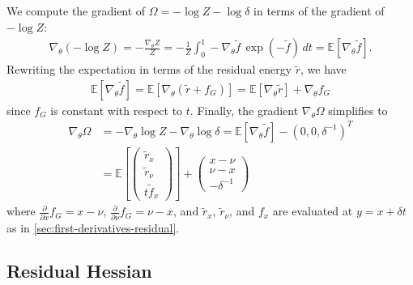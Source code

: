 \documentclass{article}
\begin{document}
We compute the gradient of $\Omega = -\log Z - \log\delta$ in terms of the gradient of $-\log Z$:
%
\begin{align}
  \nabla_{\theta} (-\log Z) = -\frac{\nabla_{\theta} Z}{Z} = -\frac{1}{Z}\int_0^1 -\nabla_{\theta} \tilde{f} \, \exp(-\tilde{f}) \, dt = \mathbb{E}[\nabla_{\theta} \tilde{f}].
\end{align}
%
Rewriting the expectation in terms of the residual energy $\tilde{r}$, we have
%
\begin{align}
  \mathbb{E}[\nabla_{\theta} \tilde{f}] = \mathbb{E}[\nabla_{\theta} (\tilde{r} + f_G)] = \mathbb{E}[\nabla_{\theta} \tilde{r}] + \nabla_{\theta} f_G
\end{align}
%
since $f_G$ is constant with respect to $t$.
Finally, the gradient $\nabla_{\theta} \Omega$ simplifies to
%
\begin{align}
  \nabla_{\theta} \Omega & = - \nabla_\theta \log Z - \nabla_\theta \log\delta = \mathbb{E}[\nabla_{\theta} \tilde{f}] - (0, 0, \delta^{-1})^T \\
                         & = \mathbb{E}\left[ \begin{pmatrix} \tilde{r}_x \\ \tilde{r}_\nu \\ t \tilde{f}_x \end{pmatrix} \right]
  + \begin{pmatrix} x - \nu \\ \nu - x \\ -\delta^{-1} \end{pmatrix}
\end{align}
%
where $\frac{\partial}{\partial x} f_G = x - \nu$, $\frac{\partial}{\partial \nu} f_G = \nu - x$, and $\tilde{r}_x$, $\tilde{r}_\nu$, and $f_x$ are evaluated at $y=x+\delta t$ as in \cref{sec:first-derivatives-residual}.

\subsection{Residual Hessian}\label{sec:qrician-residual-hessian}
\end{document}
